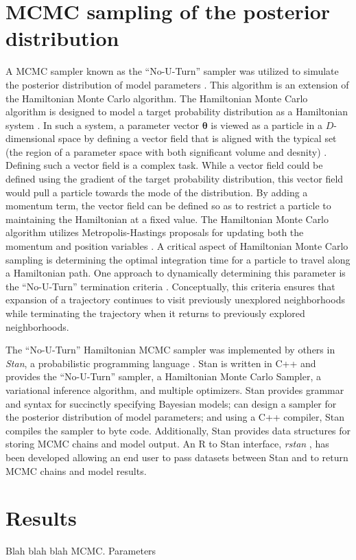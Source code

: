 \begin{DoubleSpace*}
\section{MCMC sampling of the posterior distribution}
A MCMC sampler known as the ``No-U-Turn'' sampler was utilized to simulate the posterior distribution of model parameters \cite{hoffman2014}. This algorithm is an extension of the Hamiltonian Monte Carlo algorithm. The Hamiltonian Monte Carlo algorithm is designed to model a target probability distribution as a Hamiltonian system \cite{betancourt2017}. In such a system, a parameter vector $\boldsymbol{\theta}$ is viewed as a particle in a $D$-dimensional space \cite{neal2011} by defining a vector field that is aligned with the typical set (the region of a parameter space with both significant volume and desnity) \cite{betancourt2017}. Defining such a vector field is a complex task. While a vector field could be defined using the gradient of the target probability distribution, this vector field would pull a particle towards the mode of the distribution. By adding a momentum term, the vector field can be defined so as to restrict a particle to maintaining the Hamiltonian at a fixed value. The Hamiltonian Monte Carlo algorithm utilizes Metropolis-Hastings proposals for updating both the momentum and position variables \cite{neal2011,betancourt2017}. A critical aspect of Hamiltonian Monte Carlo sampling is determining the optimal integration time for a particle to travel along a Hamiltonian path. One approach to dynamically determining this parameter is the ``No-U-Turn'' termination criteria \cite{hoffman2014,betancourt2017}. Conceptually, this criteria ensures that expansion of a trajectory continues to visit previously unexplored neighborhoods while terminating the trajectory when it returns to previously explored neighborhoods.

The ``No-U-Turn'' Hamiltonian MCMC sampler was implemented by others in \emph{Stan}, a probabilistic programming language \cite{carpenter2017}. Stan is written in C++ and provides the ``No-U-Turn'' sampler, a Hamiltonian Monte Carlo Sampler, a variational inference algorithm, and multiple optimizers. Stan provides grammar and syntax for succinctly specifying Bayesian models; can design a sampler for the posterior distribution of model parameters; and using a C++ compiler, Stan compiles the sampler to byte code. Additionally, Stan provides data structures for storing MCMC chains and model output. An R to Stan interface, \emph{rstan} \cite{stan2018}, has been developed allowing an end user to pass datasets between Stan and to return MCMC chains and model results. 

\section{Results}
Blah blah blah MCMC. Parameters

\end{DoubleSpace*}

